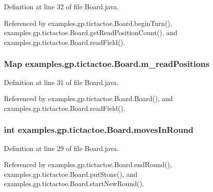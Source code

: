 Definition at line 32 of file Board.\-java.



Referenced by examples.\-gp.\-tictactoe.\-Board.\-begin\-Turn(), examples.\-gp.\-tictactoe.\-Board.\-get\-Read\-Position\-Count(), and examples.\-gp.\-tictactoe.\-Board.\-read\-Field().

\hypertarget{classexamples_1_1gp_1_1tictactoe_1_1_board_aa10007ea09d3626f4be425e2aaa416a1}{
\subsubsection[{m\-\_\-read\-Positions}]{\setlength{\rightskip}{0pt plus 5cm}Map examples.\-gp.\-tictactoe.\-Board.\-m\-\_\-read\-Positions\hspace{0.3cm}{\ttfamily [private]}}}\label{classexamples_1_1gp_1_1tictactoe_1_1_board_aa10007ea09d3626f4be425e2aaa416a1}


Definition at line 31 of file Board.\-java.



Referenced by examples.\-gp.\-tictactoe.\-Board.\-Board(), and examples.\-gp.\-tictactoe.\-Board.\-read\-Field().

\hypertarget{classexamples_1_1gp_1_1tictactoe_1_1_board_abbbe4475b523d12b347b7d778804295b}{
\subsubsection[{moves\-In\-Round}]{\setlength{\rightskip}{0pt plus 5cm}int examples.\-gp.\-tictactoe.\-Board.\-moves\-In\-Round\hspace{0.3cm}{\ttfamily [private]}}}\label{classexamples_1_1gp_1_1tictactoe_1_1_board_abbbe4475b523d12b347b7d778804295b}


Definition at line 29 of file Board.\-java.



Referenced by examples.\-gp.\-tictactoe.\-Board.\-end\-Round(), examples.\-gp.\-tictactoe.\-Board.\-put\-Stone(), and examples.\-gp.\-tictactoe.\-Board.\-start\-New\-Round().

